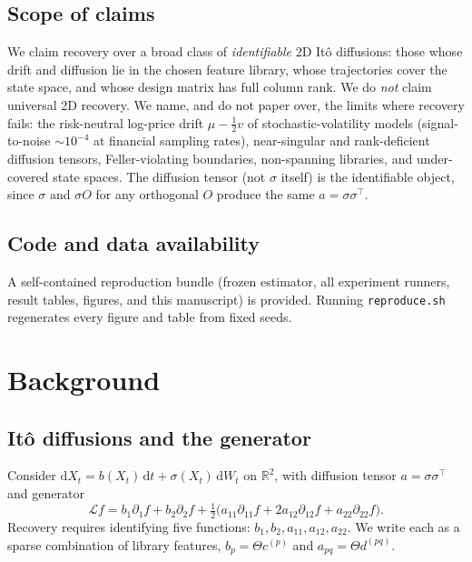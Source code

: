 \documentclass[11pt]{article}
\newcommand{\R}{\mathbb{R}}
\newcommand{\drift}{b}
\newcommand{\diff}{a}
\newcommand{\Lgen}{\mathcal{L}}
\newcommand{\xt}{X_t}
\begin{document}
\subsection{Scope of claims}\label{sec:scope}

We claim recovery over a broad class of \emph{identifiable} 2D It\^o diffusions: those whose
drift and diffusion lie in the chosen feature library, whose trajectories cover the state space,
and whose design matrix has full column rank. We do \emph{not} claim universal 2D recovery. We
name, and do not paper over, the limits where recovery fails: the risk-neutral log-price drift
$\mu-\tfrac{1}{2}v$ of stochastic-volatility models (signal-to-noise $\sim10^{-4}$ at financial
sampling rates), near-singular and rank-deficient diffusion tensors, Feller-violating boundaries,
non-spanning libraries, and under-covered state spaces. The diffusion tensor (not $\sigma$
itself) is the identifiable object, since $\sigma$ and $\sigma O$ for any orthogonal $O$ produce
the same $\diff=\sigma\sigma^\top$.

\subsection{Code and data availability}\label{sec:code}

A self-contained reproduction bundle (frozen estimator, all experiment runners, result tables,
figures, and this manuscript) is provided. Running \texttt{reproduce.sh} regenerates every
figure and table from fixed seeds.

\section{Background}\label{sec:background}

\subsection{It\^o diffusions and the generator}

Consider $\mathrm{d}\xt = \drift(\xt)\,\mathrm{d}t + \sigma(\xt)\,\mathrm{d}W_t$ on $\R^2$,
with diffusion tensor $\diff=\sigma\sigma^\top$ and generator
\begin{equation}
  \Lgen f = \drift_1\partial_1 f + \drift_2\partial_2 f
  + \tfrac{1}{2}\bigl(\diff_{11}\partial_{11}f
  + 2\diff_{12}\partial_{12}f + \diff_{22}\partial_{22}f\bigr).
\end{equation}
Recovery requires identifying five functions:
$\drift_1,\drift_2,\diff_{11},\diff_{12},\diff_{22}$. We write each as a sparse combination of
library features, $\drift_p=\Theta c^{(p)}$ and $\diff_{pq}=\Theta d^{(pq)}$.
\end{document}
